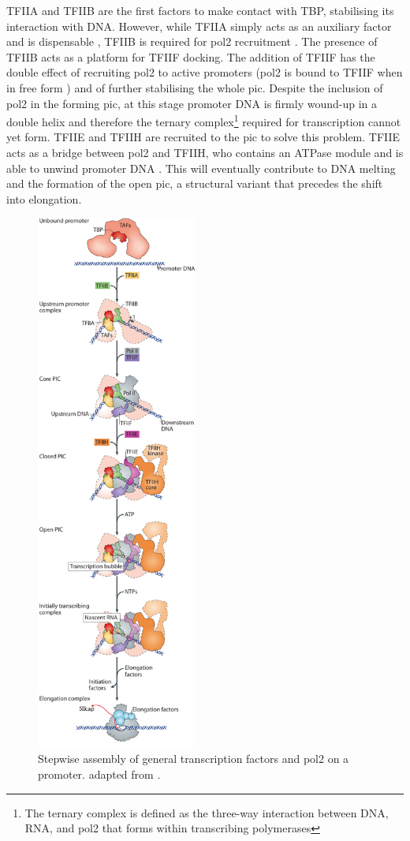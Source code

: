 TFIIA and TFIIB are the first factors to make contact with TBP, stabilising its interaction with DNA.
However, while TFIIA simply acts as an auxiliary factor and is dispensable \citep{imbalzano:1994:transcription}, TFIIB is required for \gls{pol2} recruitment \citep{bushnell:2004:structural}.
The presence of TFIIB  acts as a platform for TFIIF docking. 
The addition of TFIIF has the double effect of recruiting \gls{pol2} to active promoters (\gls{pol2} is bound to TFIIF when in free form \citep{rani:2004:rna}) and of further stabilising the whole \gls{pic}. 
Despite the inclusion of \gls{pol2} in the forming \gls{pic}, at this stage promoter DNA is firmly wound-up in a double helix and therefore the ternary complex\footnote{The ternary complex is defined as the three-way interaction between DNA, RNA, and \gls{pol2} that forms within transcribing polymerases} required for transcription cannot yet form.
TFIIE and TFIIH are recruited to the \gls{pic} to solve this problem.
TFIIE acts as a bridge between \gls{pol2} and TFIIH, who contains an ATPase module and is able to unwind promoter DNA \citep{holstege:1996:opening}.
This will eventually contribute to DNA melting and the formation of the open \gls{pic}, a structural variant that precedes the shift into elongation.

\begin{figure}
\centering
\includegraphics[width=5.275cm]{figures/introduction/picAssembly} %
\caption[Stepwise PIC assembly]{
Stepwise assembly of general transcription factors and \gls{pol2} on a promoter.
adapted from \cite{sainsbury:2015:structural}.
}
\label{fig:picAssembly}
\centering
\end{figure}

